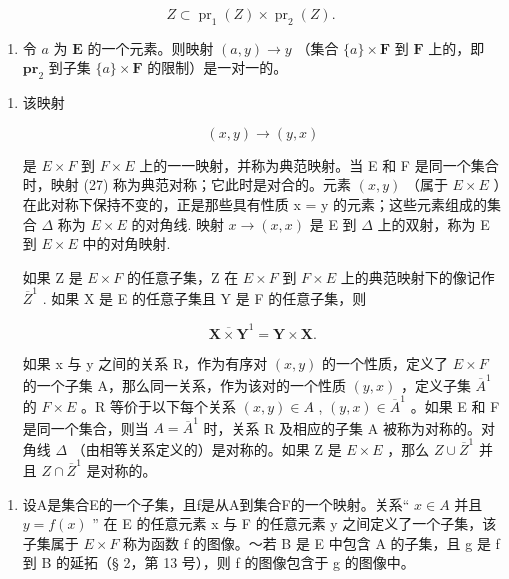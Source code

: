 \[
Z \subset \operatorname{pr} _ {1} (Z) \times \operatorname{pr} _ {2} (Z).\tag{26}
\]

\begin{enumerate}
\def\labelenumi{(\alph{enumi})}
\setcounter{enumi}{7}
\tightlist
\item
  令 \(a\) 为 \(\mathbf{E}\) 的一个元素。则映射 \((a, y) \to y\) （集合 \(\{a\} \times \mathbf{F}\) 到 \(\mathbf{F}\) 上的，即 \(\mathbf{pr}_2\) 到子集 \(\{a\} \times \mathbf{F}\) 的限制）是一对一的。
\end{enumerate}

\begin{enumerate}
\def\labelenumi{\arabic{enumi}.}
\setcounter{enumi}{3}
\item
  该映射

\[
(x, y) \rightarrow (y, x)\tag{27}
\]

是 \(E \times F\) 到 \(F \times E\) 上的一一映射，并称为典范映射。当 E 和 F 是同一个集合时，映射 (27) 称为典范对称；它此时是对合的。元素 \((x, y)\) （属于 \(E \times E\) ）在此对称下保持不变的，正是那些具有性质 x = y 的元素；这些元素组成的集合 \(\Delta\) 称为 \(E \times E\) 的对角线. 映射 \(x \to (x, x)\) 是 E 到 \(\Delta\) 上的双射，称为 E 到 \(E \times E\) 中的对角映射.

如果 Z 是 \(E \times F\) 的任意子集，Z 在 \(E \times F\) 到 \(F \times E\) 上的典范映射下的像记作 \(\overline{Z}^{1}\) . 如果 X 是 E 的任意子集且 Y 是 F 的任意子集，则

\[
\overline{\mathbf {X} \times \mathbf {Y}}^{1} = \mathbf {Y} \times \mathbf {X}.
\]

如果 x 与 y 之间的关系 R，作为有序对 \((x, y)\) 的一个性质，定义了 \(E \times F\) 的一个子集 A，那么同一关系，作为该对的一个性质 \((y, x)\) ，定义子集 \(\overline{A}^{1}\) 的 \(F \times E\) 。R 等价于以下每个关系 \((x, y) \in A\) , \((y, x) \in \overline{A}^{1}\) 。如果 E 和 F 是同一个集合，则当 \(A = \overline{A}^{1}\) 时，关系 R 及相应的子集 A 被称为对称的。对角线 \(\Delta\) （由相等关系定义的）是对称的。如果 Z 是 \(E \times E\) ，那么 \(Z \cup \overline{Z}^{1}\) 并且 \(Z \cap \overline{Z}^{1}\) 是对称的。

\end{enumerate}

\begin{enumerate}
\def\labelenumi{\arabic{enumi}.}
\setcounter{enumi}{4}
\tightlist
\item
  设A是集合E的一个子集，且f是从A到集合F的一个映射。关系“ \(x \in A\) 并且 \(y = f(x)\) '' 在 E 的任意元素 x 与 F 的任意元素 y 之间定义了一个子集，该子集属于 \(E \times F\) 称为函数 f 的图像。～若 B 是 E 中包含 A 的子集，且 g 是 f 到 B 的延拓（§ 2，第 13 号），则 f 的图像包含于 g 的图像中。
\end{enumerate}


